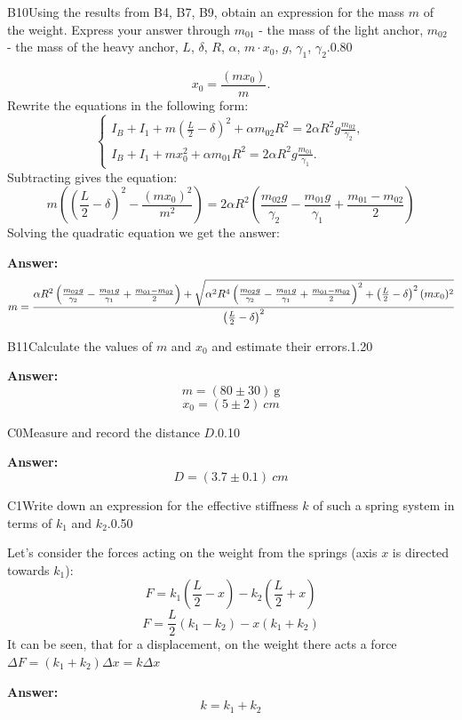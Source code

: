 \documentclass[11pt,a4paper]{article}
\begin{document}
\begin{solcard}{B10}{Using the results from B4, B7, B9, obtain an expression for the mass $m$ of the weight. Express your answer through $m_{01}$ - the mass of the light anchor, $m_{02}$ - the mass of the heavy anchor, $L$, $\delta$, $R$, $\alpha$, $m \cdot x_0$, $g$, $\gamma_1$, $\gamma_2$.}{0.80}

$$x_0 = \frac{(mx_0)}{m}.$$ Rewrite the equations in the following form: $$\begin{cases} I_B + I_1 + m\left(\frac{L}{2}-\delta\right)^2 + \alpha m_{02}R^2 = 2\alpha R^2 g \frac{m_{02}}{\gamma_2}, \\ I_B + I_1 + m x_0^2 + \alpha m_{01}R^2 = 2\alpha R^2 g \frac{m_{01}}{\gamma_1}. \end{cases}$$ Subtracting gives the equation: $$m\left(\left(\frac{L}{2} - \delta\right)^2 - \frac{(mx_0)^2}{m^2}\right) = 2\alpha R^2 \left(\frac{m_{02}g}{\gamma_2} - \frac{m_{01}g}{\gamma_1} +\frac{m_{01} - m_{02}}2\right)$$Solving the quadratic equation we get the answer:

\par\smallskip\noindent\textbf{Answer:} $$m = \cfrac{\alpha R^2 \left(\frac{m_{02}g}{\gamma_2} - \frac{m_{01}g}{\gamma_1} +\frac{m_{01} - m_{02}}2\right) + \sqrt{\alpha^2 R^4 \left(\frac{m_{02}g}{\gamma_2} - \frac{m_{01}g}{\gamma_1} +\frac{m_{01} - m_{02}}2\right)^2+ \left(\frac{L}{2} - \delta\right)^2 (mx_0)^2}}{\left(\frac{L}{2} - \delta\right)^2}$$
\end{solcard}

\begin{solcard}{B11}{Calculate the values of $m$ and $x_0$ and estimate their errors.}{1.20}
\par\smallskip\noindent\textbf{Answer:} $$m = (80 \pm 30)~\mathrm{g}$$$$x_0 = (5 \pm 2)~cm$$
\end{solcard}

\begin{solcard}{C0}{Measure and record the distance $D$.}{0.10}
\par\smallskip\noindent\textbf{Answer:} $$D = (3.7 \pm 0.1)~cm$$
\end{solcard}

\begin{solcard}{C1}{Write down an expression for the effective stiffness $k$ of such a spring system in terms of $k_1$ and $k_2$.}{0.50}

Let's consider the forces acting on the weight from the springs (axis $x$ is directed towards $k_1$): $$F = k_1\left(\frac{L}{2}-x\right) - k_2\left(\frac{L}{2}+x\right)$$$$F = \frac{L}{2}\left(k_1-k_2\right) - x(k_1+k_2)$$It can be seen, that for a displacement, on the weight there acts a force $\Delta F = (k_1 + k_2)\Delta x = k\Delta x$

\par\smallskip\noindent\textbf{Answer:} $$k = k_1 + k_2$$
\end{solcard}
\end{document}
